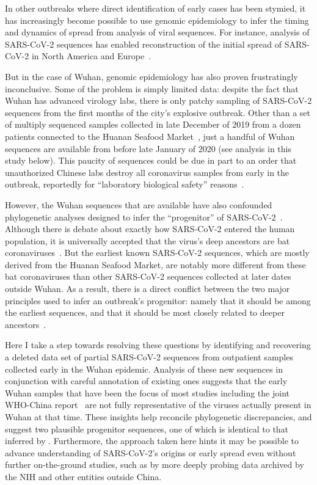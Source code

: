 \documentclass[9pt,twocolumn,twoside]{gsajnl_modified}
\begin{document}
In other outbreaks where direct identification of early cases has been stymied, it has increasingly become possible to use genomic epidemiology to infer the timing and dynamics of spread from analysis of viral sequences.
For instance, analysis of SARS-CoV-2 sequences has enabled reconstruction of the initial spread of SARS-CoV-2 in North America and Europe~\citep{bedford2020cryptic, worobey2020emergence, deng2020genomic, fauver2020coast}.

But in the case of Wuhan, genomic epidemiology has also proven frustratingly inconclusive.
Some of the problem is simply limited data: despite the fact that Wuhan has advanced virology labs, there is only patchy sampling of SARS-CoV-2 sequences from the first months of the city's explosive outbreak.
Other than a set of multiply sequenced samples collected in late December of 2019 from a dozen patients connected to the Huanan Seafood Market~\citep{WHO2021origins}, just a handful of Wuhan sequences are available from before late January of 2020 (see analysis in this study below).
This paucity of sequences could be due in part to an order that unauthorized Chinese labs destroy all coronavirus samples from early in the outbreak, reportedly for ``laboratory biological safety'' reasons~\citep{pinghui2020SCMP}.

However, the Wuhan sequences that are available have also confounded phylogenetic analyses designed to infer the ``progenitor'' of SARS-CoV-2~\citep{kumar2021evolutionary}.
Although there is debate about exactly how SARS-CoV-2 entered the human population, it is universally accepted that the virus's deep ancestors are bat coronaviruses~\citep{lytras2021exploring}.
But the earliest known SARS-CoV-2 sequences, which are mostly derived from the Huanan Seafood Market, are notably more different from these bat coronaviruses than other SARS-CoV-2 sequences collected at later dates outside Wuhan.
As a result, there is a direct conflict between the two major principles used to infer an outbreak's progenitor: namely that it should be among the earliest sequences, and that it should be most closely related to deeper ancestors~\citep{pipes2021assessing}.

Here I take a step towards resolving these questions by identifying and recovering a deleted data set of partial SARS-CoV-2 sequences from outpatient samples collected early in the Wuhan epidemic.
Analysis of these new sequences in conjunction with careful annotation of existing ones suggests that the early Wuhan samples that have been the focus of most studies including the joint WHO-China report~\citep{WHO2021origins} are not fully representative of the viruses actually present in Wuhan at that time.
These insights help reconcile phylogenetic discrepancies, and suggest two plausible progenitor sequences, one of which is identical to that inferred by \citet{kumar2021evolutionary}.
Furthermore, the approach taken here hints it may be possible to advance understanding of SARS-CoV-2's origins or early spread even without further on-the-ground studies, such as by more deeply probing data archived by the NIH and other entities outside China.
\end{document}
